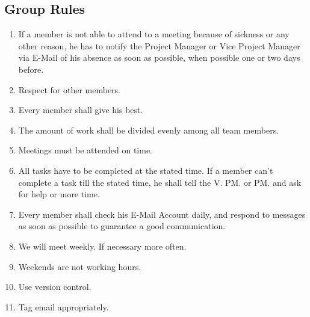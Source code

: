 \documentclass[11pt,a4paper]{article}
\begin{document}
\subsection{Group Rules}
\begin{enumerate}
\item If a member is not able to attend to a meeting because of sickness or any other reason, he has to notify the Project Manager or Vice Project Manager via E-Mail of his absence as soon as possible, when possible one or two days before.
\item Respect for other members.
\item Every member shall give his best.
\item The amount of work shall be divided evenly among all team members.
\item Meetings must be attended on time. 
\item All tasks have to be completed at the stated time. If a member can't complete a task till the stated time, he shall tell the V. PM. or PM. and ask for help or more time.
\item Every member shall check his E-Mail Account daily, and respond to messages as soon as possible to guarantee a good communication.
\item We will meet weekly. If necessary more often. 
\item Weekends are not working hours.
\item Use version control. 
\item Tag email appropriately.
\end{enumerate}

\newpage
\end{document}
